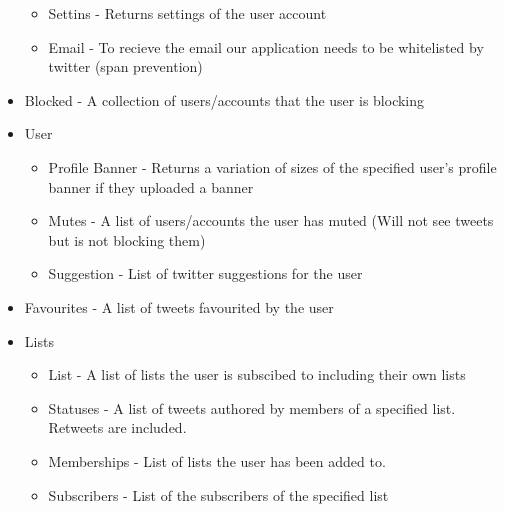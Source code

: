 \documentclass{article}
\begin{document}
\begin{itemize}
\begin{itemize}
				\item Settins - Returns settings of the user account
				\item Email - To recieve the email our application needs to be whitelisted by twitter (span prevention)
				\
			\end{itemize}
		\item Blocked - A collection of users/accounts that the user is blocking
		\item User
			\begin{itemize}
				\item Profile Banner - Returns a variation of sizes of the specified user's profile banner if they uploaded a banner
				\item Mutes - A list of users/accounts the user has muted (Will not see tweets but is not blocking them)
				\item Suggestion - List of twitter suggestions for the user
			\end{itemize}
		\item Favourites - A list of tweets favourited by the user
		\item Lists
			\begin{itemize}
				\item List - A list of lists the user is subscibed to including their own lists
				\item Statuses - A list of tweets authored by members of a specified list. Retweets are included.
				\item Memberships - List of lists the user has been added to.
				\item Subscribers - List of the subscribers of the specified list
			\end{itemize}
	\end{itemize}
\end{document}
